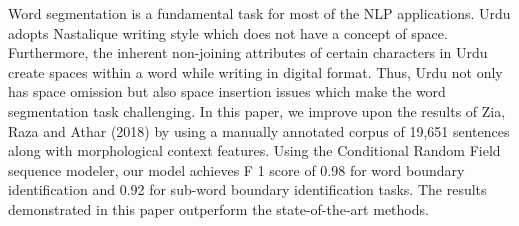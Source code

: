 Word segmentation is a fundamental task for most of the NLP applications. Urdu adopts Nastalique writing style which does not have a concept of space. Furthermore, the inherent non-joining attributes of certain characters in Urdu create spaces within a word while writing in digital format. Thus, Urdu not only has space omission but also space insertion issues which make the word segmentation task challenging. In this paper, we improve upon the results of Zia, Raza and Athar (2018) by using a manually annotated corpus of 19,651 sentences along with morphological context features. Using the Conditional Random Field sequence modeler, our model achieves F 1 score of 0.98 for word boundary identification and 0.92 for sub-word boundary identification tasks. The results demonstrated in this paper outperform the state-of-the-art methods.
